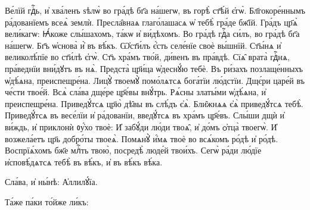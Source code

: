 \cuLettrine
Ве́лїй гдⷭ҇ь, и҆ хва́ленъ ѕѣлѡ̀ во гра́дѣ бг҃а  на́шегѡ, въ горѣ̀ ст҃ѣ́й є҆гѡ̀. 
\hKv Бл҃гокоре́ннымъ  ра́дованїемъ всеѧ̀ землѝ. 
\hKv Пресла̑внаѧ глаго́лашасѧ ѡ҆  тебѣ̀ гра́де бж҃їй. 
\hKv Гра́дъ цр҃ѧ̀ вели́кагѡ: 
\hKv  Ꙗ҆́коже слы́шахомъ, та́кѡ и҆ ви́дѣхомъ. 
\hKv Во гра́дѣ  гдⷭ҇а си́лъ, во гра́дѣ бг҃а на́шегѡ. 
\hKv Бг҃ъ ѡ҆снова̀ и҆̀  въ вѣ́къ. 
\hKv Ѡ҆ст҃и́лъ є҆́сть селе́нїе своѐ вы́шнїй.  
\hKv Ст҃ы́нѧ и҆ великолѣ́пїе во ст҃и́лѣ є҆гѡ̀. 
\hKv Ст҃ъ  хра́мъ тво́й, ди́венъ въ пра́вдѣ. 
\hKv Сїѧ̑ врата̀ гдⷭ҇нѧ,  пра́веднїи вни́дꙋтъ въ нѧ̀. 
\hKv Предста̀ цр҃и́ца ѡ҆деснꙋ́ю   тебѐ. 
\hKv Въ ри́захъ  позлаще́нныхъ ѡ҆дѣ́ѧна, преиспещре́на. 
\hKv Лицꙋ̀ твоемꙋ̀  помо́лѧтсѧ бога́тїи лю́дстїи. 
\hKv Дщє́ри царе́й въ че́сти  твое́й. 
\hKv  Всѧ̀ сла́ва дще́ре цр҃е́вы внꙋ́трь. 
\hKv  Рѧ́сны златы́ми ѡ҆дѣ́ѧна, и҆ преиспещре́на. 
\hKv  Приведꙋ́тсѧ цр҃ю̀ дѣ̑вы въ слѣ́дъ є҆ѧ̀. 
\hKv Бли̑жнѧѧ  є҆ѧ̀ приведꙋ́тсѧ тебѣ̀. 
\hKv Приведꙋ́тсѧ въ весе́лїи и҆  ра́дованїи, введꙋ́тсѧ въ хра́мъ цр҃е́въ. 
\hKv Слы́ши дщѝ и҆  ви́ждь, и҆ приклонѝ ᲂу҆́хо твоѐ: 
\hKv И҆ забꙋ́ди лю́ди  твоѧ̑, и҆ до́мъ ѻ҆тца̀ твоегѡ̀. 
\hKv И҆ возжела́етъ цр҃ь  добро́ты твоеѧ̀. 
\hKv Помѧнꙋ̀ и҆́мѧ твоѐ во всѧ́комъ ро́дѣ  и҆ ро́дѣ. 
\hKv Воспрїѧ́хомъ бж҃е млⷭ҇ть твою̀, посредѣ̀  люде́й твои́хъ. 
\hKv Сегѡ̀ ра́ди лю́дїе и҆сповѣ́дѧтсѧ  тебѣ̀ въ вѣ́къ, и҆ въ вѣ́къ вѣ́ка. 

\hKv Сла́ва, и҆ ны́нѣ: А҆ллилꙋ́їа. 



%
Та́же па́ки то́йже ли́къ: 

